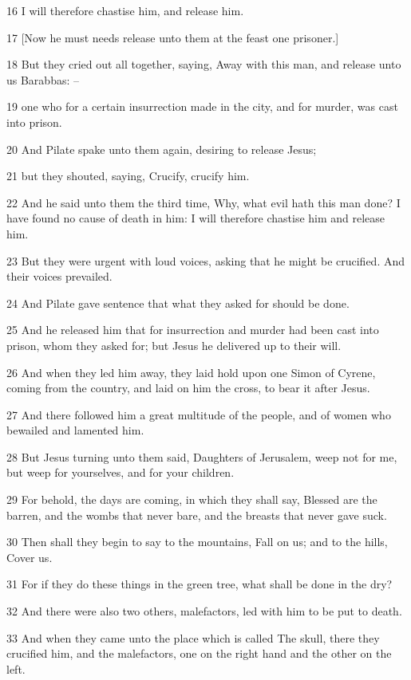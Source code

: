 \par 16 I will therefore chastise him, and release him.
\par 17 [Now he must needs release unto them at the feast one prisoner.]
\par 18 But they cried out all together, saying, Away with this man, and release unto us Barabbas: --
\par 19 one who for a certain insurrection made in the city, and for murder, was cast into prison.
\par 20 And Pilate spake unto them again, desiring to release Jesus;
\par 21 but they shouted, saying, Crucify, crucify him.
\par 22 And he said unto them the third time, Why, what evil hath this man done? I have found no cause of death in him: I will therefore chastise him and release him.
\par 23 But they were urgent with loud voices, asking that he might be crucified. And their voices prevailed.
\par 24 And Pilate gave sentence that what they asked for should be done.
\par 25 And he released him that for insurrection and murder had been cast into prison, whom they asked for; but Jesus he delivered up to their will.
\par 26 And when they led him away, they laid hold upon one Simon of Cyrene, coming from the country, and laid on him the cross, to bear it after Jesus.
\par 27 And there followed him a great multitude of the people, and of women who bewailed and lamented him.
\par 28 But Jesus turning unto them said, Daughters of Jerusalem, weep not for me, but weep for yourselves, and for your children.
\par 29 For behold, the days are coming, in which they shall say, Blessed are the barren, and the wombs that never bare, and the breasts that never gave suck.
\par 30 Then shall they begin to say to the mountains, Fall on us; and to the hills, Cover us.
\par 31 For if they do these things in the green tree, what shall be done in the dry?
\par 32 And there were also two others, malefactors, led with him to be put to death.
\par 33 And when they came unto the place which is called The skull, there they crucified him, and the malefactors, one on the right hand and the other on the left.
